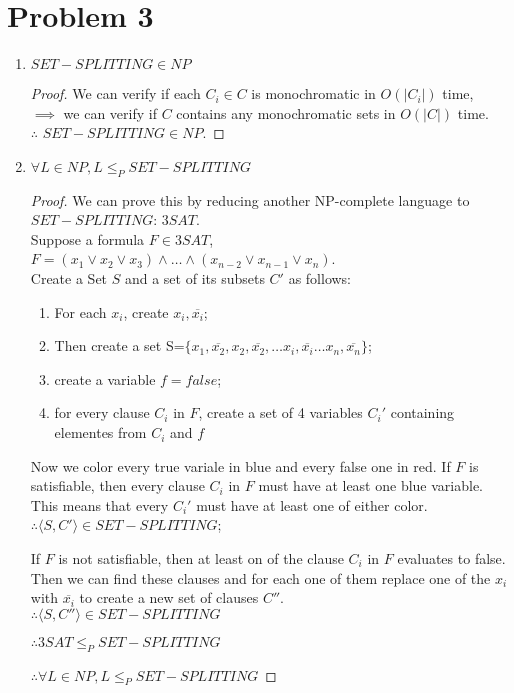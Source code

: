 \documentclass[letterpaper]{article}
\begin{document}
\section*{Problem 3}
\begin{enumerate}
    \item $SET-SPLITTING \in NP$ \begin{proof}
        We can verify if each $C_i \in C$ is monochromatic in $O(|C_i|)$ time, \\
        $\implies$ we can verify if $C$ contains any monochromatic sets in $O(|C|)$ time.\\
        $\therefore$ $SET-SPLITTING \in NP$.
    \end{proof}
    \item $\forall L \in NP, L \leq_P SET-SPLITTING$ \begin{proof}
        We can prove this by reducing another NP-complete language to $SET-SPLITTING$: $3SAT$.\\
        Suppose a formula $F \in 3SAT$, $F=(x_1 \lor x_2 \lor x_3) \land \dots \land (x_{n-2} \lor x_{n-1} \lor x_n)$.\\
        Create a Set $S$ and a set of its subsets $C'$ as follows:
        \begin{enumerate}
            \item For each $x_i$, create $ x_i, \overline{x_i}$;
            \item Then create a set S=$\{x_1, \overline{x_2}, x_2, \overline{x_2},\dots x_i, \overline{x_i}\dots x_n, \overline{x_n}\}$;
            \item create a variable $f=false$; 
            \item for every clause $C_i$ in $F$, create a set of 4 variables $C_i'$ containing elementes from $C_i$ and $f$
        \end{enumerate}
        Now we color every true variale in blue and every false one in red.
        If $F$ is satisfiable, then every clause $C_i$ in $F$ must have at least one blue variable. This means that every $C_i'$ must have at least one of either color.\\
        $\therefore \langle S, C' \rangle \in SET-SPLITTING$;

        If $F$ is not satisfiable, then at least on of the clause $C_i$ in $F$ evaluates to false. Then we can find these clauses and for each one of them replace one of the $x_i$ with $\overline{x_i}$ to create a new set of clauses $C''$.\\
        $\therefore \langle S, C'' \rangle \in SET-SPLITTING$

        $\therefore 3SAT \leq_P SET-SPLITTING$ 

        $\therefore \forall L \in NP, L \leq_P SET-SPLITTING$
    \end{proof}
\end{enumerate}
\end{document}
